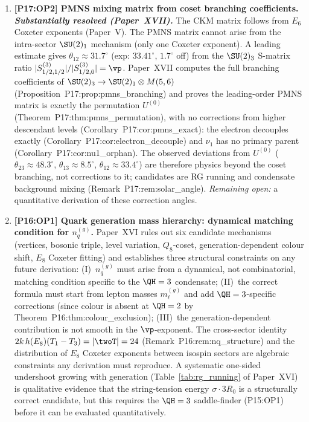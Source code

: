 \begin{enumerate}[label=,leftmargin=*]
\item \textbf{[P17:OP2] PMNS mixing matrix from coset branching coefficients. \emph{Substantially resolved (Paper~XVII).}}
The CKM matrix follows from $E_6$ Coxeter exponents (Paper~V). The PMNS
matrix cannot arise from the intra-sector $\SU(2)_1$ mechanism (only one
Coxeter exponent). A leading estimate gives $\theta_{12}\approx31.7^\circ$
(exp: $33.41^\circ$, $1.7^\circ$ off) from the $\SU(2)_3$ S-matrix ratio
$|S_{1/2,1/2}^{(3)}|/|S_{1/2,0}^{(3)}|=\vp$.
Paper~XVII computes the full branching coefficients of
$\SU(2)_3\to\SU(2)_1\otimes M(5,6)$ (Proposition~P17:prop:pmns\_branching)
and proves the leading-order PMNS matrix is exactly the permutation
$U^{(0)}$ (Theorem~P17:thm:pmns\_permutation), with no corrections from
higher descendant levels (Corollary~P17:cor:pmns\_exact): the electron
decouples exactly (Corollary~P17:cor:electron\_decouple) and $\nu_1$ has no
primary parent (Corollary~P17:cor:nu1\_orphan). The observed deviations from
$U^{(0)}$ ($\theta_{23}\approx48.3^\circ$, $\theta_{13}\approx8.5^\circ$,
$\theta_{12}\approx33.4^\circ$) are therefore physics beyond the coset
branching, not corrections to it; candidates are RG running and
condensate background mixing (Remark~P17:rem:solar\_angle). \emph{Remaining
open:} a quantitative derivation of these correction angles.


\item \textbf{[P16:OP1] Quark generation mass hierarchy: dynamical matching condition for $n_q^{(g)}$.}
Paper~XVI rules out six candidate mechanisms (vertices, bosonic triple, level variation,
$Q_8$-coset, generation-dependent colour shift, $E_8$ Coxeter fitting) and establishes
three structural constraints on any future derivation: (I)~$n_q^{(g)}$ must arise from a
dynamical, not combinatorial, matching condition specific to the $\QH=3$ condensate;
(II)~the correct formula must start from lepton masses $m_\ell^{(g)}$ and add
$\QH=3$-specific corrections (since colour is absent at $\QH=2$ by Theorem~P16:thm:colour\_exclusion);
(III)~the generation-dependent contribution is not smooth in the $\vp$-exponent. The cross-sector
identity $2k\,h(E_8)(T_1-T_3)=|\twoT|=24$ (Remark~P16:rem:nq\_structure) and the distribution of
$E_8$ Coxeter exponents between isospin sectors are algebraic constraints any derivation must
reproduce. A systematic one-sided undershoot growing with generation
(Table~\ref{tab:rg_running} of Paper~XVI) is qualitative evidence that the
string-tension energy $\sigma\cdot3R_0$ is a structurally correct candidate, but this requires
the $\QH=3$ saddle-finder (P15:OP1) before it can be evaluated quantitatively.


\end{enumerate}
